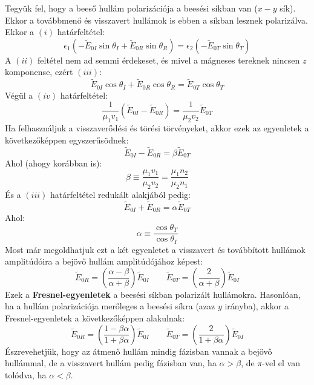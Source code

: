 \documentclass[a4paper,12pt]{article}
\begin{document}
Tegyük fel, hogy a beeső hullám polarizációja a beesési síkban van ($x-y$ sík). Ekkor a továbbmenő és visszavert hullámok is ebben a síkban lesznek polarizálva.
Ekkor a $(i)$ határfeltétel:
\begin{equation}
    \epsilon_1 (- \tilde{E}_{0I} \sin \theta_I + \tilde{E}_{0R} \sin \theta_R) = \epsilon_2 (- \tilde{E}_{0T} \sin \theta_T)
\end{equation}
A $(ii)$ feltétel nem ad semmi érdekeset, és mivel a mágneses tereknek nincsen $z$ komponense, ezért $(iii)$:
\begin{equation}
    \tilde{E}_{0I} \cos \theta_I + \tilde{E}_{0R} \cos \theta_R = \tilde{E}_{0T} \cos \theta_T
\end{equation}
Végül a $(iv)$ határfeltétel:
\begin{equation}
    \frac{1}{\mu_1 v_1} \left( \tilde{E}_{0I} - \tilde{E}_{0R} \right) = \frac{1}{\mu_2 v_2} \tilde{E}_{0T}
\end{equation}
Ha felhasználjuk a visszaverődési és törési törvényeket, akkor ezek az egyenletek a következőképpen egyszerűsödnek:
\begin{equation}
    \tilde{E}_{0I} - \tilde{E}_{0R} = \beta \tilde{E}_{0T}
\end{equation}
Ahol (ahogy korábban is):
\begin{equation}
    \beta \equiv \frac{\mu_1 v_1}{\mu_2 v_2} = \frac{\mu_1 n_2}{\mu_2 n_1}
\end{equation}
És a $(iii)$ határfeltétel redukált alakjából pedig:
\begin{equation}
    \tilde{E}_{0I} + \tilde{E}_{0R} = \alpha \tilde{E}_{0T}
\end{equation}
Ahol:
\begin{equation}
    \alpha \equiv \frac{\cos \theta_T}{\cos \theta_I}
\end{equation}
Most már megoldhatjuk ezt a két egyenletet a visszavert és továbbított hullámok amplitúdóira a bejövő hullám amplitúdójához képest:
\begin{equation}
    \boxed{\tilde{E}_{0R} = \left( \frac{\alpha - \beta}{\alpha + \beta} \right) \tilde{E}_{0I} \qquad \tilde{E}_{0T} = \left( \frac{2}{\alpha + \beta} \right) \tilde{E}_{0I}}
\end{equation}
Ezek a \textbf{Fresnel-egyenletek} a beesési síkban polarizált hullámokra. Hasonlóan, ha a hullám polarizációja merőleges a beesési síkra (azaz $y$ irányba), akkor a Fresnel-egyenletek a következőképpen alakulnak:
\begin{equation}
    \boxed{\tilde{E}_{0R} = \left( \frac{1 - \beta \alpha}{1 + \beta \alpha} \right) \tilde{E}_{0I} \qquad \tilde{E}_{0T} = \left( \frac{2}{1 + \beta \alpha} \right) \tilde{E}_{0I}}
\end{equation}
Észrevehetjük, hogy az átmenő hullám mindig fázisban vannak a bejövő hullámmal, de a visszavert hullám pedig fázisban van, ha $\alpha > \beta$, de $\pi$-vel el van tolódva, ha $\alpha < \beta$.
\end{document}
